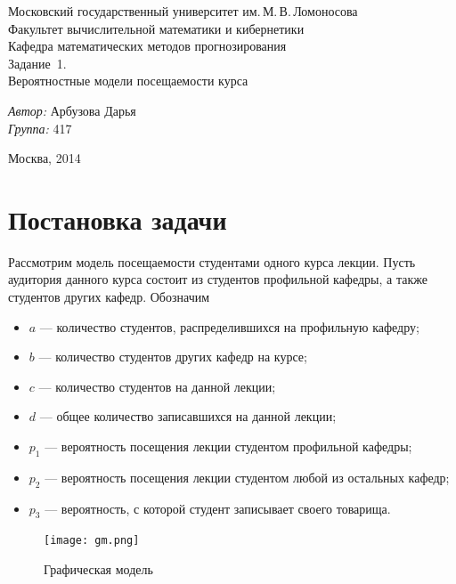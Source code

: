 \documentclass[12pt,a4paper,oneside,fleqn,leqno]{article}
\begin{document}
	\begin{titlepage}
		\begin{center}
			\large Московский государственный университет им.\,М.\,В.\,Ломоносова\\
			Факультет вычислительной математики и кибернетики \\
			Кафедра математических методов прогнозирования \\[4.5cm] 
			\Huge Задание \No\,1.\\Вероятностные модели посещаемости курса\\[5.5cm]
		\end{center}
		\normalsize
		\begin{flushright}
			\emph{Автор:} Арбузова Дарья\\
			\emph{Группа:} 417\\
		\end{flushright}
		\vfill
		\begin{center}
			Москва, 2014
		\end{center}
	\end{titlepage}
	\tableofcontents
	\newpage
	\section{Постановка задачи}
		Рассмотрим модель посещаемости студентами одного курса лекции. Пусть аудитория данного курса состоит из студентов профильной кафедры, а также студентов других кафедр. Обозначим\\
		\begin{minipage}{0.7\textwidth}
		\vspace{10pt}
			\begin{itemize}
				\item
				$a$ --- количество студентов, распределившихся на профильную кафедру;
				\item
				$b$ --- количество студентов других кафедр на курсе;
				\item
				$c$ --- количество студентов на данной лекции;
				\item
				$d$ --- общее количество записавшихся на данной лекции;
				\item
				$p_1$ --- вероятность посещения лекции студентом профильной кафедры;
				\item
				$p_2$ --- вероятность посещения лекции студентом любой из остальных кафедр;
				\item
				$p_3$ --- вероятность, с которой студент записывает своего товарища.
			\end{itemize}
		\end{minipage}
		\begin{minipage}{0.3\textwidth}
			\begin{figure}[H]
				\captionsetup{justification=centering}
				\texttt{[image: gm.png]}
				\caption{Графическая модель}
				\label{fig:gm}
			\end{figure}
		\end{minipage}
\end{document}
